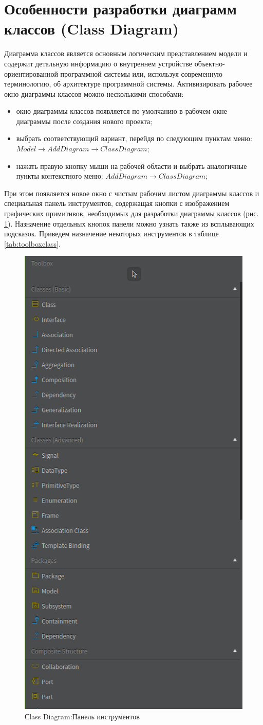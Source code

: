 \documentclass[a4paper,12pt]{report}
\begin{document}
\section{Особенности разработки диаграмм классов (Class Diagram)}
Диаграмма классов является основным логическим представлением модели и содержит детальную информацию о внутреннем устройстве объектно-ориентированной программной системы или, используя современную терминологию, об архитектуре программной системы. Активизировать рабочее окно диаграммы классов можно несколькими способами:
\begin{itemize}
	\item окно диаграммы классов появляется по умолчанию в рабочем окне диаграммы после создания нового проекта;
	\item выбрать соответствующий вариант, перейдя по следующим пунктам меню: \\$Model \to Add Diagram \to Class Diagram$;
	\item нажать правую кнопку мыши на рабочей области и выбрать аналогичные пункты контекстного меню: $Add Diagram \to Class Diagram$;
\end{itemize}

При этом появляется новое окно с чистым рабочим листом диаграммы классов и специальная панель инструментов, содержащая кнопки с изображением графических примитивов, необходимых для разработки диаграммы классов (рис. \ref{fig:toolboxclass}). Назначение отдельных кнопок панели можно узнать также из всплывающих подсказок. Приведем назначение некоторых инструментов в таблице \ref{tab:toolboxclass}.

\begin{figure}[h!]
	\centering
	\includegraphics[width=0.5\linewidth]{images/toolboxclass}
	\caption{Сlass Diagram:Панель инструментов}
	\label{fig:toolboxclass}
\end{figure}
\end{document}
